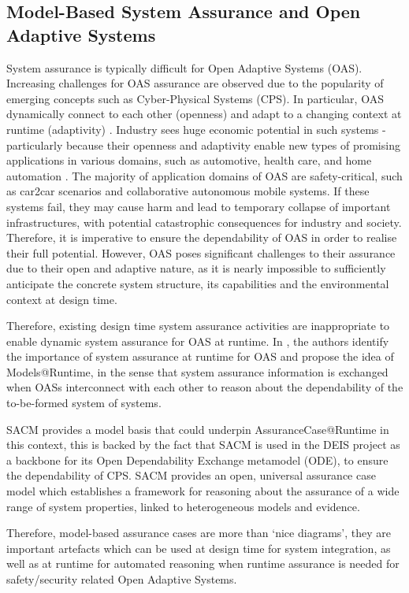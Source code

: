 \subsection{Model-Based System Assurance and Open Adaptive Systems}
System assurance is typically difficult for Open Adaptive Systems (OAS). 
Increasing challenges for OAS assurance are observed due to the popularity of emerging concepts such as Cyber-Physical Systems (CPS).
In particular, OAS dynamically connect to each other (openness) and adapt to a changing context at runtime (adaptivity) \cite{trapp2013safety}.
Industry sees huge economic potential in such systems - particularly because their openness and adaptivity enable new types of promising applications in various domains, such as automotive, health care, and home automation \cite{wei2017deis}.
The majority of application domains of OAS are safety-critical, such as car2car scenarios and collaborative autonomous mobile systems.
If these systems fail, they may cause harm and lead to temporary collapse of important infrastructures, with potential catastrophic consequences for industry and society.
Therefore, it is imperative to ensure the dependability of OAS in order to realise their full potential. 
However, OAS poses significant challenges to their assurance due to their open and adaptive nature, as it is nearly impossible to sufficiently anticipate the concrete system structure, its capabilities and the environmental context at design time.

Therefore, existing design time system assurance activities are inappropriate to enable dynamic system assurance for OAS at runtime. 
In \cite{trapp2013safety}, the authors identify the importance of system assurance at runtime for OAS and propose the idea of Models@Runtime, in the sense that system assurance information is exchanged when OASs interconnect with each other to reason about the dependability of the to-be-formed system of systems.

SACM provides a model basis that could underpin AssuranceCase@Runtime in this context, this is backed by the fact that SACM is used in the DEIS project \cite{wei2017deis} as a backbone for its Open Dependability Exchange metamodel (ODE), to ensure the dependability of CPS. SACM provides an open, universal assurance case model which establishes a framework for reasoning about the assurance of a wide range of system properties, linked to heterogeneous models and evidence. 

Therefore, model-based assurance cases are more than `nice diagrams', they are important artefacts which can be used at design time for system integration, as well as at runtime for automated reasoning when runtime assurance is needed for safety/security related Open Adaptive Systems.

